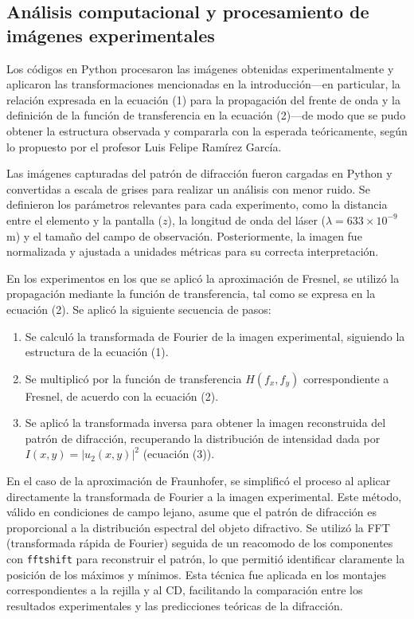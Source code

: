 \documentclass[6pt,a4paper]{article}
\begin{document}
\subsection{Análisis computacional y procesamiento de imágenes experimentales}

Los códigos en Python procesaron las imágenes obtenidas experimentalmente y aplicaron las transformaciones mencionadas en la introducción—en particular, la relación expresada en la ecuación (1) para la propagación del frente de onda y la definición de la función de transferencia en la ecuación (2)—de modo que se pudo obtener la estructura observada y compararla con la esperada teóricamente, según lo propuesto por el profesor Luis Felipe Ramírez García.

Las imágenes capturadas del patrón de difracción fueron cargadas en Python y convertidas a escala de grises para realizar un análisis con menor ruido. Se definieron los parámetros relevantes para cada experimento, como la distancia entre el elemento y la pantalla ($z$), la longitud de onda del láser ($\lambda = 633\times10^{-9}$ m) y el tamaño del campo de observación. Posteriormente, la imagen fue normalizada y ajustada a unidades métricas para su correcta interpretación.

En los experimentos en los que se aplicó la aproximación de Fresnel, se utilizó la propagación mediante la función de transferencia, tal como se expresa en la ecuación (2). Se aplicó la siguiente secuencia de pasos:
\begin{enumerate}
    \item Se calculó la transformada de Fourier de la imagen experimental, siguiendo la estructura de la ecuación (1).
    \item Se multiplicó por la función de transferencia $H(f_x,f_y)$ correspondiente a Fresnel, de acuerdo con la ecuación (2).
    \item Se aplicó la transformada inversa para obtener la imagen reconstruida del patrón de difracción, recuperando la distribución de intensidad dada por \( I(x,y) = |u_2(x,y)|^2 \) (ecuación (3)).
\end{enumerate}

En el caso de la aproximación de Fraunhofer, se simplificó el proceso al aplicar directamente la transformada de Fourier a la imagen experimental. Este método, válido en condiciones de campo lejano, asume que el patrón de difracción es proporcional a la distribución espectral del objeto difractivo. Se utilizó la FFT (transformada rápida de Fourier) seguida de un reacomodo de los componentes con \texttt{fftshift} para reconstruir el patrón, lo que permitió identificar claramente la posición de los máximos y mínimos. Esta técnica fue aplicada en los montajes correspondientes a la rejilla y al CD, facilitando la comparación entre los resultados experimentales y las predicciones teóricas de la difracción.
\end{document}
